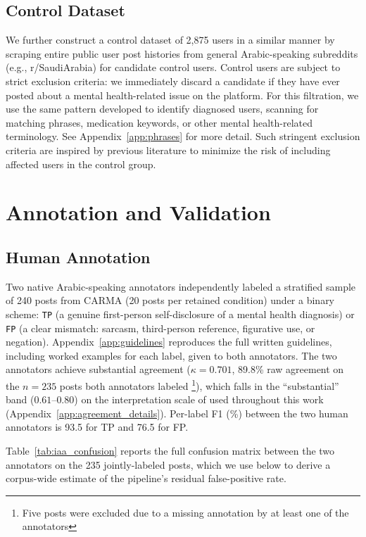 \documentclass[11pt]{article}
\begin{document}
\subsection{Control Dataset}
We further construct a control dataset of 2,875 users in a similar manner by scraping entire public user post histories from general Arabic-speaking subreddits (e.g., r/SaudiArabia) for candidate control users. Control users are subject to strict exclusion criteria: we immediately discard a candidate if they have ever posted about a mental health-related issue on the platform. For this filtration, we use the same pattern developed to identify diagnosed users, scanning for matching phrases, medication keywords, or other mental health-related terminology. See Appendix~\ref{app:phrases} for more detail. Such stringent exclusion criteria are inspired by previous literature \cite{cohan-etal-2018-smhd} to minimize the risk of including affected users in the control group.

\section{Annotation and Validation}
\label{sec:annotation}

\subsection{Human Annotation}
\label{subsec:human_annotation}
Two native Arabic-speaking annotators
independently labeled a stratified sample of 240 posts from CARMA (20
posts per retained condition) under a binary scheme:
\texttt{TP} (a genuine first-person self-disclosure of a mental health
diagnosis) or \texttt{FP} (a clear mismatch:
sarcasm, third-person reference, figurative use, or negation). Appendix~\ref{app:guidelines}
reproduces the full written guidelines, including worked examples for
each label, given to both annotators. The two annotators achieve substantial agreement ($\kappa = 0.701$,
89.8\% raw agreement on the $n{=}235$ posts both annotators labeled \footnote{Five posts were excluded due to a missing annotation by at least one of the annotators}),
which falls in the ``substantial'' band ($0.61$--$0.80$) on the
interpretation scale of \citet{landis1977measurement} used throughout this
work (Appendix~\ref{app:agreement_details}). Per-label F1 (\%) between the two human annotators is 93.5 for TP and 76.5 for FP.


Table~\ref{tab:iaa_confusion} reports the full confusion matrix between
the two annotators on the 235 jointly-labeled posts, which we use below
to derive a corpus-wide estimate of the pipeline's residual
false-positive rate.
\end{document}

